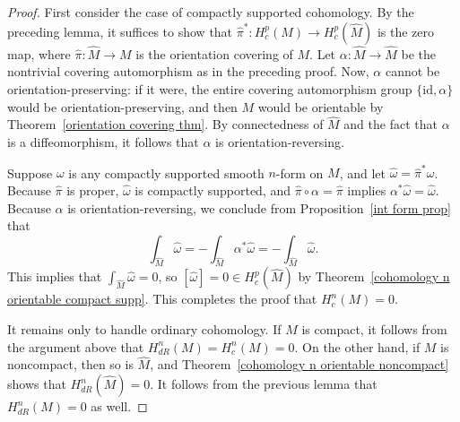 \begin{proof}
First consider the case of compactly supported cohomology. By the preceding lemma, it suffices to show that $\widehat{\pi}^*:H^p_{c}(M)\to H^p_{c}(\widehat{M})$ is the zero map, where $\widehat{\pi}:\widehat{M}\to M$ is the orientation covering of $M$. Let $\alpha:\widehat{M}\to\widehat{M}$ be the nontrivial covering automorphism as in the preceding proof. Now, $\alpha$ cannot be orientation-preserving: if it were, the entire covering automorphism group $\{\mathrm{id},\alpha\}$ would be orientation-preserving, and then $M$ would be orientable by Theorem~\ref{orientation covering thm}. By connectedness of $\widehat{M}$ and the fact that $\alpha$ is a diffeomorphism, it follows that $\alpha$ is orientation-reversing.\par
Suppose $\omega$ is any compactly supported smooth $n$-form on $M$, and let $\widehat{\omega}=\widehat{\pi}^*\omega$. Because $\widehat{\pi}$ is proper, $\widehat{\omega}$ is compactly supported, and $\widehat{\pi}\circ\alpha=\widehat{\pi}$ implies $\alpha^*\widehat{\omega}=\widehat{\omega}$. Because $\alpha$ is orientation-reversing, we conclude from Proposition~\ref{int form prop} that
\[\int_{\widehat{M}}\widehat{\omega}=-\int_{\widehat{M}}\alpha^*\widehat{\omega}=-\int_{\widehat{M}}\widehat{\omega}.\]
This implies that $\int_{\widehat{M}}\widehat{\omega}=0$, so $[\widehat{\omega}]=0\in H^p_c(\widehat{M})$ by Theorem~\ref{cohomology n orientable compact supp}. This completes the proof that $H^n_c(M)=0$.\par
It remains only to handle ordinary cohomology. If $M$ is compact, it follows from the argument above that $H^n_{dR}(M)=H^n_c(M)=0$. On the other hand, if $M$ is noncompact, then so is $\widehat{M}$, and Theorem~\ref{cohomology n orientable noncompact} shows that $H^n_{dR}(\widehat{M})=0$. It follows from the previous lemma that $H^n_{dR}(M)=0$ as well.
\end{proof}
